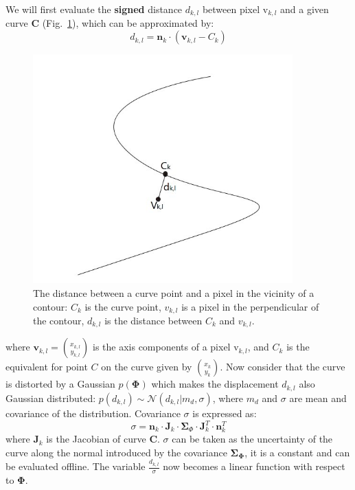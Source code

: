 We will first evaluate the \textbf{signed} distance $d_{k,l}$ between pixel
$\mathrm{v}_{k,l}$ and a given curve $\mathbf{C}$
(Fig.~\ref{fig:dis}), which
can be approximated by:
\begin{equation}
  \label{eq:dis}
  d_{k,l} = \mathbf{n}_k \cdot ( \mathbf{v}_{k,l} - C_k)
\end{equation}

\begin{figure}[htbp]
  \centering
  \includegraphics[width=10cm]{images/dis.jpg}
  \caption[The distance between a curve point and a pixel in the vicinity
  of a contour]{The distance between a curve point and a pixel in the
    vicinity of a contour: $C_k$ is the curve point, $v_{k,l}$ is a
    pixel in the perpendicular of the contour, $d_{k,l}$ is the
    distance between $C_k$ and $v_{k,l}$.}
  \label{fig:dis}
\end{figure}

where $\mathbf{v}_{k,l} = {x_{k,l} \choose y_{k,l}}$ is the axis
components of a pixel
$\mathrm{v}_{k,l}$, and $C_k$ is the equivalent for point $C$ on the
curve given by ${x_k \choose y_k}$. Now consider that the curve is
distorted by a Gaussian $p(\mathbf{\Phi})$ which makes the displacement $d_{k,l}$ also Gaussian distributed: $p(d_{k,l}) \sim
\mathcal{N}(d_{k,l}|m_d, \sigma)$, where $m_d$ and $\sigma$ are mean
and covariance of the distribution. Covariance $\sigma$ is expressed as:
\begin{equation}
  \label{eq:cov}
  \sigma = \mathbf{n}_k \cdot \mathbf{J}_k \cdot \mathbf{\Sigma}_{\Phi}
  \cdot \mathbf{J}_k^T \cdot \mathbf{n}_k^T
\end{equation}
where $\mathbf{J}_k$ is the Jacobian of curve $\mathbf{C}$. $\sigma$
can be taken as the uncertainty of the curve along the normal
introduced by the covariance
$\mathbf{\Sigma}_{\mathbf{\Phi}}$, it is a constant and can be
evaluated offline. The variable
$\frac{d_{k,l}}{\sigma}$ now becomes a linear function with respect to $\mathbf{\Phi}$.

